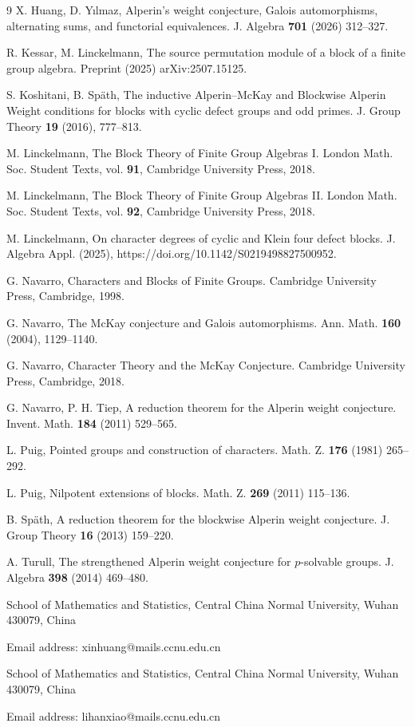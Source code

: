 \documentclass[preprint,12pt,3p]{elsarticle}
\begin{document}
\begin{thebibliography}{9}
X. Huang, D. Y\i lmaz, Alperin's weight conjecture, Galois automorphisms, alternating sums, and functorial equivalences. J. Algebra {\bf 701} (2026) 312--327.



R. Kessar, M. Linckelmann, The source permutation module of a block of a finite group algebra. Preprint (2025) arXiv:2507.15125.

S. Koshitani, B. Sp\"{a}th, The inductive Alperin--McKay and Blockwise Alperin Weight conditions for blocks with cyclic defect groups and odd primes. J. Group Theory {\bf19} (2016), 777--813.

M. Linckelmann, The Block Theory of Finite Group Algebras I. London Math. Soc. Student Texts, vol. {\bf91}, Cambridge University Press, 2018.

M. Linckelmann, The Block Theory of Finite Group Algebras II. London Math. Soc. Student Texts, vol. {\bf92}, Cambridge University Press, 2018.

M. Linckelmann, On character degrees of cyclic and Klein four defect blocks. J. Algebra Appl. (2025), https://doi.org/10.1142/S0219498827500952. 

G. Navarro, Characters and Blocks of Finite Groups. Cambridge University Press, Cambridge, 1998.

G. Navarro, The McKay conjecture and Galois automorphisms. Ann. Math. {\bf 160} (2004), 1129--1140.

G. Navarro,
Character Theory and the McKay Conjecture. Cambridge University Press, Cambridge, 2018.

G. Navarro, P. H. Tiep, A reduction theorem for the Alperin weight conjecture. Invent. Math. {\bf 184} (2011) 529--565.

L. Puig, Pointed groups and construction of characters. Math. Z. {\bf 176} (1981) 265--292.

L. Puig, Nilpotent extensions of blocks. Math. Z. {\bf 269} (2011) 115--136.








B. Sp\"{a}th, A reduction theorem for the blockwise Alperin weight conjecture. J. Group Theory {\bf 16} (2013) 159--220.
	
A. Turull, The strengthened Alperin weight conjecture for $p$-solvable groups. J. Algebra {\bf 398} (2014) 469--480.  



\end{thebibliography}


\bigskip
{\footnotesize School of Mathematics and Statistics, Central China Normal University, Wuhan 430079, China
	
Email address: xinhuang@mails.ccnu.edu.cn

\smallskip School of Mathematics and Statistics, Central China Normal University, Wuhan 430079, China

Email address: lihanxiao@mails.ccnu.edu.cn}
\end{document}
